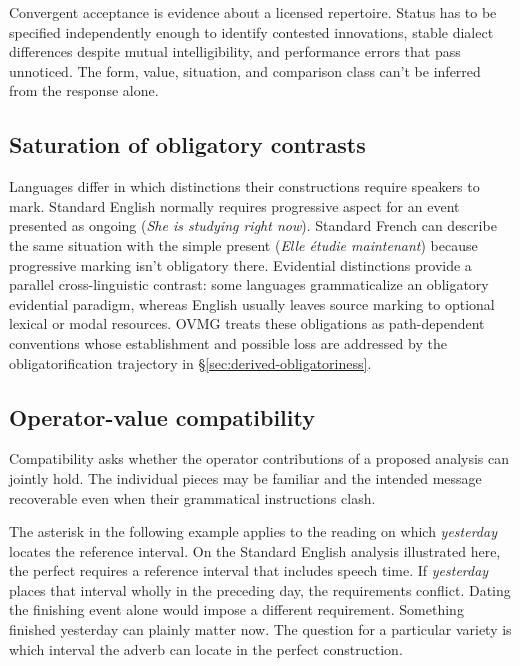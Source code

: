 \documentclass[12pt,letterpaper]{article}
\newcommand{\mention}[1]{\textit{#1}}
\begin{document}
Convergent acceptance is evidence about a licensed repertoire. Status has to be
specified independently enough to identify contested innovations, stable
dialect differences despite mutual intelligibility, and performance errors that
pass unnoticed. The form, value, situation, and comparison class can't be
inferred from the response alone.

\subsection{Saturation of obligatory contrasts}
\label{sec:community-values}

Languages differ in which distinctions their constructions require speakers to
mark. Standard English normally requires progressive aspect for an event
presented as ongoing (\mention{She is studying right now}). Standard French can
describe the same situation with the simple present
(\mention{Elle étudie maintenant}) because progressive marking isn't obligatory
there. Evidential distinctions provide a parallel cross-linguistic contrast:
some languages grammaticalize an obligatory evidential paradigm, whereas
English usually leaves source marking to optional lexical or modal resources.
OVMG treats these obligations as path-dependent conventions whose establishment
and possible loss are addressed by the obligatorification trajectory in
\S\ref{sec:derived-obligatoriness}.

\subsection{Operator-value compatibility}

Compatibility asks whether the operator contributions of a proposed analysis
can jointly hold. The individual pieces may be familiar and the intended
message recoverable even when their grammatical instructions clash.

The asterisk in the following example applies to the reading on which
\mention{yesterday} locates the reference interval.
\ea[*]{\mention{I've finished it yesterday.}}\label{ex:tense-sem}
\z
On the Standard English analysis illustrated here, the perfect requires a
reference interval that includes speech time. If \mention{yesterday} places
that interval wholly in the preceding day, the requirements conflict. Dating
the finishing event alone would impose a different requirement. Something finished yesterday
can plainly matter now. The question for a particular variety is which
interval the adverb can locate in the perfect construction.
\end{document}
